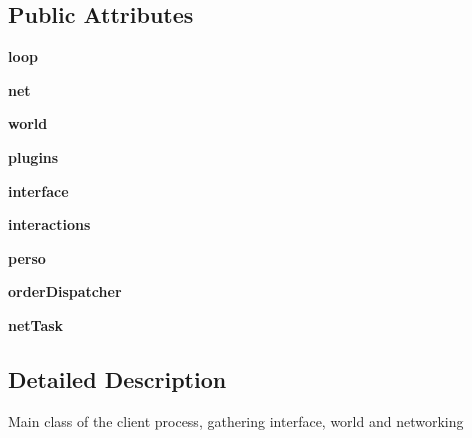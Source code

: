 \subsection*{\-Public \-Attributes}
\begin{DoxyCompactItemize}
\item 
\hypertarget{classclient_1_1_client_a8cb5660eab73a84ffff78f931fba9f4a}{{\bfseries loop}}\label{classclient_1_1_client_a8cb5660eab73a84ffff78f931fba9f4a}

\item 
\hypertarget{classclient_1_1_client_a0bfd89eab5cd378c69d11a95ec3e9771}{{\bfseries net}}\label{classclient_1_1_client_a0bfd89eab5cd378c69d11a95ec3e9771}

\item 
\hypertarget{classclient_1_1_client_a514fa5a25b192d7c319dac3e81589139}{{\bfseries world}}\label{classclient_1_1_client_a514fa5a25b192d7c319dac3e81589139}

\item 
\hypertarget{classclient_1_1_client_a155c1a6cd1cd389f752946ae1be7df4e}{{\bfseries plugins}}\label{classclient_1_1_client_a155c1a6cd1cd389f752946ae1be7df4e}

\item 
\hypertarget{classclient_1_1_client_ac94a649fda29e1ef94a92729ce7c345c}{{\bfseries interface}}\label{classclient_1_1_client_ac94a649fda29e1ef94a92729ce7c345c}

\item 
\hypertarget{classclient_1_1_client_a2c24cff4ee58fef1de7de126cef3840e}{{\bfseries interactions}}\label{classclient_1_1_client_a2c24cff4ee58fef1de7de126cef3840e}

\item 
\hypertarget{classclient_1_1_client_a3f9927aadf41668bb2398b6404296076}{{\bfseries perso}}\label{classclient_1_1_client_a3f9927aadf41668bb2398b6404296076}

\item 
\hypertarget{classclient_1_1_client_a55b0a0b65f2cbc5bbeab157000db0ff4}{{\bfseries order\-Dispatcher}}\label{classclient_1_1_client_a55b0a0b65f2cbc5bbeab157000db0ff4}

\item 
\hypertarget{classclient_1_1_client_a80840f1460afc8548a654b36e7ca69f0}{{\bfseries net\-Task}}\label{classclient_1_1_client_a80840f1460afc8548a654b36e7ca69f0}

\end{DoxyCompactItemize}


\subsection{\-Detailed \-Description}
\begin{DoxyVerb}Main class of the client process, gathering interface, world and networking \end{DoxyVerb}
 

